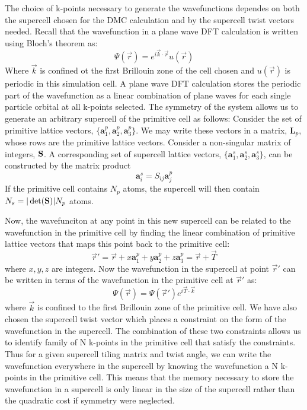 The choice of k-points necessary to generate the wavefunctions dependes on both the supercell chosen for the DMC calculation and by the supercell twist vectors needed.  Recall that the wavefunction in a plane wave DFT calculation is written using Bloch's theorem as:
\begin{equation}
\Psi(\vec{r}) = e^{i\vec{k}\cdot\vec{r}}u(\vec{r})
\end{equation}
Where $\vec{k}$ is confined ot the first Brillouin zone of the cell chosen and $u(\vec{r})$ is periodic in this simulation cell.  A plane wave DFT calculation stores the periodic part of the wavefunction as a linear combination of plane waves for each single particle orbital at all k-points selected.  The symmetry of the system allows us to generate an arbitrary supercell of the primitive cell as follows:  Consider the set of primitive lattice vectors, $ \{ \mathbf{a}^p_1, \mathbf{a}^p_2,
\mathbf{a}^p_3\} $.  We may write these vectors in a matrix, $\mathbf{L}_p$, whose
rows are the primitive lattice vectors.  Consider a non-singular
matrix of integers, $\mathbf{S}$.  A corresponding set of supercell lattice
vectors, $\{\mathbf{a}^s_1, \mathbf{a}^s_2, \mathbf{a}^s_3\}$, can be constructed by the matrix
product 
\begin{equation}
\mathbf{a}^s_i = S_{ij} \mathbf{a}^p_j
\end{equation}
If the primitive cell contains $N_p$ atoms, the supercell will then
contain $N_s = |\det(\mathbf{S})| N_p$ atoms.

Now, the wavefunciton at any point in this new supercell can be related to the wavefunction in the primitive cell by  finding the linear combination of primitive lattice vectors that maps this point back to the primitive cell:
\begin{equation}
\vec{r}' = \vec{r} + x \mathbf{a}^p_1 + y \mathbf{a}^p_2 + z\mathbf{a}^p_3 = \vec{r} + \vec{T}
\end{equation}
where $x, y, z$ are integers.   Now the wavefunction in the supercell at point $\vec{r}'$ can be written in terms of the wavefunction in the primitive cell at $\vec{r}'$ as:
\begin{equation}
\Psi(\vec{r}) = \Psi(\vec{r}') e^{i \vec{T} \cdot \vec{k}}
\end{equation}
where $\vec{k}$ is confined to the first Brillouin zone of the primitive cell.  We have also chosen the supercell twist vector which places a constraint on the form of the wavefunction in the supercell.  The combination of these two constraints allows us to identify family of N k-points in the primitive cell that satisfy the constraints.  Thus for a given supercell tiling matrix and twist angle, we can write the wavefunction everywhere in the supercell by knowing the wavefunction a N k-points in the primitive cell.  This means that the memory necessary to store the wavefunction in a supercell is only linear in the size of the supercell rather than the quadratic cost if symmetry were neglected.

